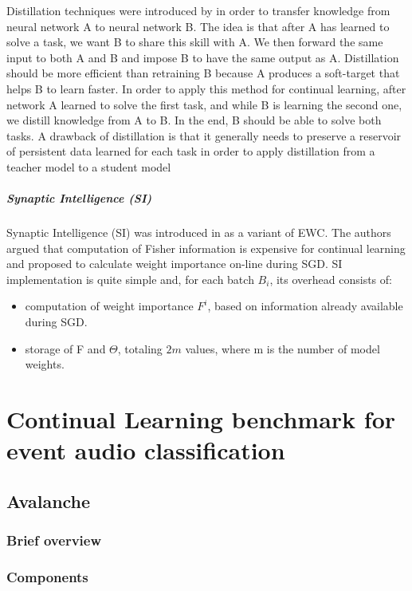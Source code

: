 \documentclass[english, LaM, oneside]{sapthesis}%
\begin{document}
Distillation techniques were introduced by \cite{distillation} in order to transfer knowledge from neural network A to neural network B. The idea is that after A has learned to solve a task, we want B to share this skill with A. We then forward the same input to both A and B and impose B to have the same output as A. Distillation should be more efficient than retraining B because A produces a soft-target that helps B to learn faster. In order to apply this method for continual learning, after network A learned to solve the first task, and while B is learning the second one, we distill knowledge from A to B. In the end, B should be able to solve both tasks. A drawback of distillation is that it generally needs to preserve a reservoir of persistent data learned for each task in order to apply distillation from a teacher model to a student model
\subsubsection{Synaptic Intelligence (SI)}
Synaptic Intelligence (SI) was introduced in \cite{zenke} as a variant of EWC. The authors argued that computation of Fisher information is expensive for continual learning and proposed to calculate weight importance on-line during SGD.
SI implementation is quite simple and, for each batch $B_i$, its overhead consists of:
\begin{itemize}
    \item computation of weight importance $F^i$, based on information already available during SGD.
    \item storage of F and $\Theta$, totaling $2m$ values, where m is the number of model weights.
\end{itemize}



\part{Continual Learning benchmark for event audio classification}
\chapter{Avalanche}
\section{Brief overview}
\section{Components}
\end{document}
